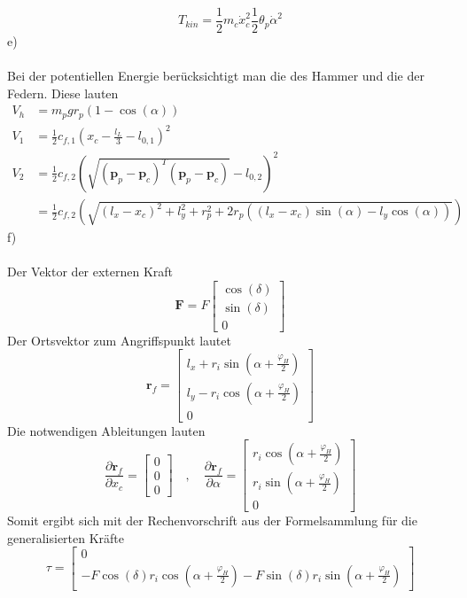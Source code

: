 \[
	T_{kin} = \frac{1}{2}m_c\dot{x}^2_c \frac{1}{2}\theta_p\dot{\alpha}^2
\]
\newpage
\noindent
e)\\ \\
Bei der potentiellen Energie berücksichtigt man die des Hammer und die der Federn. Diese lauten
\begin{align*}
	V_h &= m_pgr_p(1 - \cos(\alpha)) \\
	V_1 &= \frac{1}{2}c_{f,1}\left(x_c - \frac{l_L}{3} - l_{0,1}\right)^2 \\
	V_2 &= \frac{1}{2}c_{f,2}\left(\sqrt{(\textbf{p}_p - \textbf{p}_c)^T(\textbf{p}_p - \textbf{p}_c)} - l_{0,2}\right)^2 \\
	&= \frac{1}{2}c_{f,2}\left(\sqrt{(l_x - x_c)^2 + l_y^2 + r_p^2 + 2r_p((l_x - x_c)\sin(\alpha) - l_y\cos(\alpha))}\right)
\end{align*}
f)\\ \\
Der Vektor der externen Kraft
\[
	\textbf{F} = F\begin{bmatrix}
		\cos(\delta) \\
		\sin(\delta) \\
		0
	\end{bmatrix}
\]
Der Ortsvektor zum Angriffspunkt lautet
\[
	\textbf{r}_f = \begin{bmatrix}
		l_x + r_i\sin\left(\alpha + \frac{\varphi_H}{2}\right) \\
		l_y - r_i\cos\left(\alpha + \frac{\varphi_H}{2}\right) \\
		0		
	\end{bmatrix}
\]
Die notwendigen Ableitungen lauten
\[
	\frac{\partial \textbf{r}_f}{\partial x_c} = \begin{bmatrix}
		0 \\
		0 \\
		0
	\end{bmatrix}
	\quad,\quad
		\frac{\partial \textbf{r}_f}{\partial \alpha} = \begin{bmatrix}
	r_i\cos\left(\alpha + \frac{\varphi_H}{2}\right) \\
	r_i\sin\left(\alpha + \frac{\varphi_H}{2}\right)\\
	0
	\end{bmatrix}
\]
Somit ergibt sich mit der Rechenvorschrift aus der Formelsammlung für die generalisierten Kräfte
\[
	\tau = \begin{bmatrix}
		0 \\
		-F\cos(\delta)r_i\cos\left(\alpha + \frac{\varphi_H}{2}\right) - F\sin(\delta)r_i\sin\left(\alpha + \frac{\varphi_H}{2}\right)
	\end{bmatrix}
\]